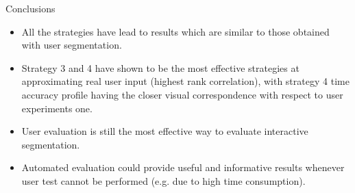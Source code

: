 \begin{frame}[t,fragile]{Conclusions}
\begin{itemize}
\item All the strategies have lead to results which are similar to those obtained with user segmentation.
\item Strategy 3 and 4 have shown to be the most effective strategies at approximating real user input (highest rank correlation), with strategy 4 time accuracy profile having the closer visual correspondence with respect to user experiments one. 
\item User evaluation is still the most effective way to evaluate interactive segmentation.
\item Automated evaluation could provide useful and informative results whenever user test cannot be performed (e.g. due to high time consumption).
\end{itemize}
\end{frame}
